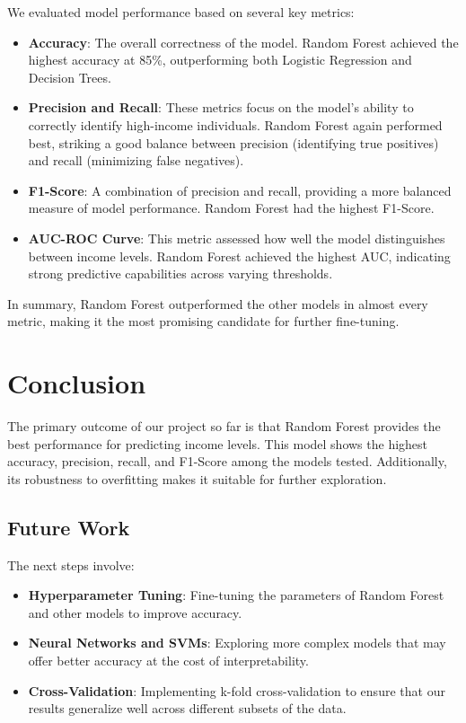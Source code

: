 \documentclass[10pt,twocolumn,letterpaper]{article}
\begin{document}
We evaluated model performance based on several key metrics:
\begin{itemize}
    \item \textbf{Accuracy}: The overall correctness of the model. Random Forest achieved the highest accuracy at 85\%, outperforming both Logistic Regression and Decision Trees.
    \item \textbf{Precision and Recall}: These metrics focus on the model’s ability to correctly identify high-income individuals. Random Forest again performed best, striking a good balance between precision (identifying true positives) and recall (minimizing false negatives).
    \item \textbf{F1-Score}: A combination of precision and recall, providing a more balanced measure of model performance. Random Forest had the highest F1-Score.
    \item \textbf{AUC-ROC Curve}: This metric assessed how well the model distinguishes between income levels. Random Forest achieved the highest AUC, indicating strong predictive capabilities across varying thresholds.
\end{itemize}

In summary, Random Forest outperformed the other models in almost every metric, making it the most promising candidate for further fine-tuning.

\section{Conclusion}
\label{sec:conclusion}

The primary outcome of our project so far is that Random Forest provides the best performance for predicting income levels. This model shows the highest accuracy, precision, recall, and F1-Score among the models tested. Additionally, its robustness to overfitting makes it suitable for further exploration.

\subsection{Future Work}
The next steps involve:
\begin{itemize}
    \item \textbf{Hyperparameter Tuning}: Fine-tuning the parameters of Random Forest and other models to improve accuracy.
    \item \textbf{Neural Networks and SVMs}: Exploring more complex models that may offer better accuracy at the cost of interpretability.
    \item \textbf{Cross-Validation}: Implementing k-fold cross-validation to ensure that our results generalize well across different subsets of the data.
\end{itemize}
\end{document}
